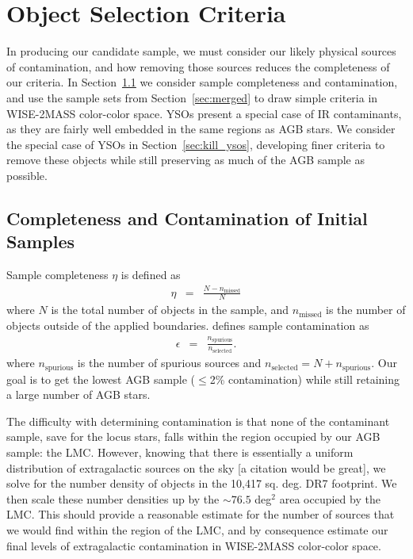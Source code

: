 \section{Object Selection Criteria}
\label{sec:criteria}
In producing our candidate sample, we must consider our likely physical sources of contamination, and how removing those sources reduces the completeness of our criteria. In Section~\ref{sec:comp_cont} we consider sample completeness and contamination, and use the sample sets from Section~\ref{sec:merged} to draw simple criteria in WISE-2MASS color-color space. YSOs present a special case of IR contaminants, as they are fairly well embedded in the same regions as AGB stars. We consider the special case of YSOs in Section~\ref{sec:kill_ysos}, developing finer criteria to remove these objects while still preserving as much of the AGB sample as possible.

\subsection{Completeness and Contamination of Initial Samples}\label{sec:comp_cont}
Sample completeness $\eta$ is defined as
\begin{eqnarray*}
\eta &=& \frac{N - n_\text{missed}}{N}
\end{eqnarray*}
where $N$ is the total number of objects in the sample, and $n_\text{missed}$ is the number of objects outside of the applied boundaries. \cite{2013sdmm.book.....I} defines sample contamination as
\begin{eqnarray*}
\epsilon &=& \frac{n_\text{spurious}}{n_\text{selected}}.
\end{eqnarray*}
where $n_\text{spurious}$ is the number of spurious sources and $n_\text{selected} = N + n_\text{spurious}$. Our goal is to get the lowest AGB sample ($\le$2\% contamination) while still retaining a large number of AGB stars.

The difficulty with determining contamination is that none of the contaminant sample, save for the locus stars,  falls within the region occupied by our AGB sample: the LMC. However, knowing that there is essentially a uniform distribution of extragalactic sources on the sky {\color{red}[a citation would be great]}, we solve for the number density of objects in the 10,417 sq. deg. DR7 footprint. We then scale these number densities up by the $\sim76.5$ deg$^2$ area occupied by the LMC. This should provide a reasonable estimate for the number of sources that we would find within the region of the LMC, and by consequence estimate our final levels of extragalactic contamination in WISE-2MASS color-color space. 

